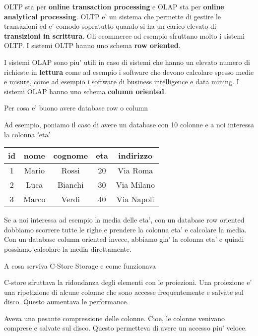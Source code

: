 OLTP sta per \textbf{online transaction processing} e OLAP sta per
\textbf{online analytical processing}. OLTP e' un sistema che permette di
gestire le transazioni ed e' comodo sopratutto quando si ha un carico elevato
di \textbf{transizioni in scrittura}. Gli ecommerce ad esempio sfruttano molto
i sistemi OLTP. I sistemi OLTP hanno uno schema \textbf{row oriented}.

I sistemi OLAP sono piu' utili in caso di sistemi che hanno un elevato numero
di richieste in \textbf{lettura} come ad esempio i software che devono
calcolare spesso medie e misure, come ad esempio i software di business
intelligence e data mining. I sistemi OLAP hanno uno schema \textbf{column
    oriented}.

\begin{domanda}
    Per cosa e' buono avere database row o column
\end{domanda}

Ad esempio, poniamo il caso di avere un database con 10 colonne e a noi
interessa la colonna 'eta'

\begin{table}[H]
    \centering
    \begin{tabular}{|c|c|c|c|c|}
        \hline
        id & nome  & cognome & eta & indirizzo  \\ \hline
        1  & Mario & Rossi   & 20  & Via Roma   \\ \hline
        2  & Luca  & Bianchi & 30  & Via Milano \\ \hline
        3  & Marco & Verdi   & 40  & Via Napoli \\ \hline
    \end{tabular}
\end{table}

Se a noi interessa ad esempio la media delle eta', con un database row oriented
dobbiamo scorrere tutte le righe e prendere la colonna eta' e calcolare la
media. Con un database column oriented invece, abbiamo gia' la colonna eta' e
quindi possiamo calcolare la media direttamente.

\begin{domanda}
    A cosa serviva C-Store Storage e come funzionava
\end{domanda}

C-store sfruttava la ridondanza degli elementi con le proiezioni. Una
proiezione e' una ripetizione di alcune colonne che sono accesse frequentemente
e salvate sul disco. Questo aumentava le performance.

Aveva una pesante compressione delle colonne. Cioe, le colonne venivano
comprese e salvate sul disco. Questo permetteva di avere un accesso piu'
veloce.

